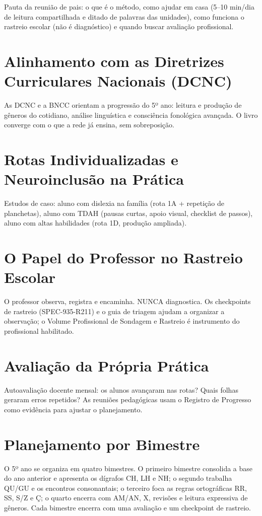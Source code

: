 Pauta da reunião de pais: o que é o método, como ajudar em casa (5–10 min/dia de leitura compartilhada e ditado de palavras das unidades), como funciona o rastreio escolar (não é diagnóstico) e quando buscar avaliação profissional.


\chapter{Alinhamento com as Diretrizes Curriculares Nacionais (DCNC)}

As DCNC e a BNCC orientam a progressão do 5º ano: leitura e produção de gêneros do cotidiano, análise linguística e consciência fonológica avançada. O livro converge com o que a rede já ensina, sem sobreposição.


\chapter{Rotas Individualizadas e Neuroinclusão na Prática}

Estudos de caso: aluno com dislexia na família (rota 1A + repetição de planchetas), aluno com TDAH (pausas curtas, apoio visual, checklist de passos), aluno com altas habilidades (rota 1D, produção ampliada).


\chapter{O Papel do Professor no Rastreio Escolar}

O professor observa, registra e encaminha. NUNCA diagnostica. Os checkpoints de rastreio (SPEC-935-R211) e o guia de triagem ajudam a organizar a observação; o Volume Profissional de Sondagem e Rastreio é instrumento do profissional habilitado.


\chapter{Avaliação da Própria Prática}

Autoavaliação docente mensal: os alunos avançaram nas rotas? Quais folhas geraram erros repetidos? As reuniões pedagógicas usam o Registro de Progresso como evidência para ajustar o planejamento.


\chapter{Planejamento por Bimestre}

O 5º ano se organiza em quatro bimestres. O primeiro bimestre consolida a base do ano anterior e apresenta os dígrafos CH, LH e NH; o segundo trabalha QU/GU e os encontros consonantais; o terceiro foca as regras ortográficas RR, SS, S/Z e Ç; o quarto encerra com AM/AN, X, revisões e leitura expressiva de gêneros. Cada bimestre encerra com uma avaliação e um checkpoint de rastreio.



